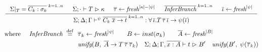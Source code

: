 \fbox{$\Sigma;\Delta;\Gamma |-^\psi \varphi \return \sigma$}
\[ \inference
      { \Sigma|_T = \overline{C_k:\sigma_k}^{\;k=1..n}
      & \Sigma;\cdot |- T \return \kappa
      & \overline\tau <- \fresh^{|\kappa| - |\psi|}
      & \overline{\textit{InferBranch}}^{\;k=1..n}
      & \overline\iota <-\fresh^{|\psi|} }
      { \Sigma;\Delta;\Gamma
           |-^\psi \overline{C_k\;\overline{x} -> t}^{\;k=1..n}
           : \forall\,\overline\iota . T\,\overline{\tau}\,\overline\iota ->
                                       \psi(\overline\iota) }
\]
\begin{align*}
\text{where} ~~~~
\textit{InferBranch} ~\stackrel{\mathrm{def}}{=}~
&~ \overline{\tau}_k <- \textit{fresh}^{|\psi|} \qquad
   B <- inst(\sigma_k) \qquad 
   \overline{A} <- \textit{fresh}^{|B|} \\
&~ \textit{unify}(B,\; \overline{A} -> T\,\overline{\tau}\,\overline{\tau}_k) \quad
   \Sigma;\Delta;\Gamma,\overline{x:A} |- t \mathrel{\rhd} B' \quad
   \textit{unify}(B',\; \psi(\overline{\tau}_k))
\end{align*}

